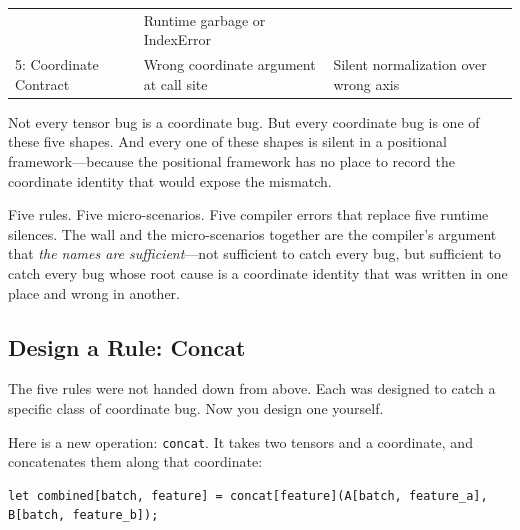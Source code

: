 \documentclass[11pt,titlepage]{article}
\begin{document}
\begin{longtable}[]{@{}lll@{}}
\begin{minipage}[t]{0.30\columnwidth}
\end{minipage} & \begin{minipage}[t]{0.30\columnwidth}\raggedright
Runtime garbage or IndexError\strut
\end{minipage}\tabularnewline
\begin{minipage}[t]{0.30\columnwidth}\raggedright
5: Coordinate Contract\strut
\end{minipage} & \begin{minipage}[t]{0.30\columnwidth}\raggedright
Wrong coordinate argument at call site\strut
\end{minipage} & \begin{minipage}[t]{0.30\columnwidth}\raggedright
Silent normalization over wrong axis\strut
\end{minipage}\tabularnewline
\bottomrule
\end{longtable}

Not every tensor bug is a coordinate bug. But every coordinate bug is
one of these five shapes. And every one of these shapes is silent in a
positional framework---because the positional framework has no place to
record the coordinate identity that would expose the mismatch.

Five rules. Five micro-scenarios. Five compiler errors that replace five
runtime silences. The wall and the micro-scenarios together are the
compiler's argument that \emph{the names are sufficient}---not
sufficient to catch every bug, but sufficient to catch every bug whose
root cause is a coordinate identity that was written in one place and
wrong in another.

\vspace{2em}

\hypertarget{design-a-rule-concat}{%
\subsection{Design a Rule: Concat}\label{design-a-rule-concat}}

The five rules were not handed down from above. Each was designed to
catch a specific class of coordinate bug. Now you design one yourself.

Here is a new operation: \texttt{concat}. It takes two tensors and a
coordinate, and concatenates them along that coordinate:

\begin{verbatim}
let combined[batch, feature] = concat[feature](A[batch, feature_a], B[batch, feature_b]);
\end{verbatim}
\end{document}
